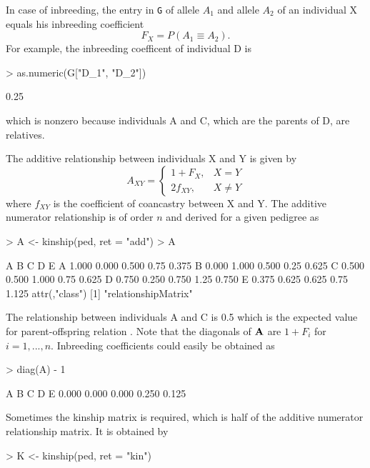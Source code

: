 \documentclass[a4paper,11pt]{article}
\begin{document}
In case of inbreeding, the entry in \texttt{G} of allele $A_1$ and allele $A_2$ of an individual X equals his inbreeding coefficient $$F_X=P(A_1 \equiv A_2).$$ For example, the inbreeding coefficent of individual D is
\begin{Schunk}
\begin{Sinput}
> as.numeric(G["D_1", "D_2"])
\end{Sinput}
\begin{Soutput}
[1] 0.25
\end{Soutput}
\end{Schunk}
which is nonzero because individuals A and C, which are the parents of D, are relatives. 

 The additive relationship between individuals X and Y is given by
$$ A_{XY} = \begin{cases} 1+F_X, & X=Y \\ 2f_{XY}, & X\neq Y \end{cases}$$
where $f_{XY}$ is the coefficient of coancastry between X and Y. The additive numerator relationship is of order $n$ and derived for a given pedigree as
\begin{Schunk}
\begin{Sinput}
> A <- kinship(ped, ret = "add")
> A
\end{Sinput}
\begin{Soutput}
      A     B     C    D     E
A 1.000 0.000 0.500 0.75 0.375
B 0.000 1.000 0.500 0.25 0.625
C 0.500 0.500 1.000 0.75 0.625
D 0.750 0.250 0.750 1.25 0.750
E 0.375 0.625 0.625 0.75 1.125
attr(,"class")
[1] "relationshipMatrix"
\end{Soutput}
\end{Schunk}
The relationship between individuals A and C is 0.5 which is the expected value for parent-offspring relation \citep{Bernardo2002}. Note that the diagonals of $\bf A$ are $1+F_i$ for $i=1,...,n$. 
Inbreeding coefficients could easily be obtained as
\begin{Schunk}
\begin{Sinput}
> diag(A) - 1
\end{Sinput}
\begin{Soutput}
    A     B     C     D     E 
0.000 0.000 0.000 0.250 0.125 
\end{Soutput}
\end{Schunk}
Sometimes the kinship matrix is required, which is half of the additive numerator relationship matrix. It is obtained by
\begin{Schunk}
\begin{Sinput}
> K <- kinship(ped, ret = "kin")
\end{Sinput}
\end{Schunk}
\end{document}
